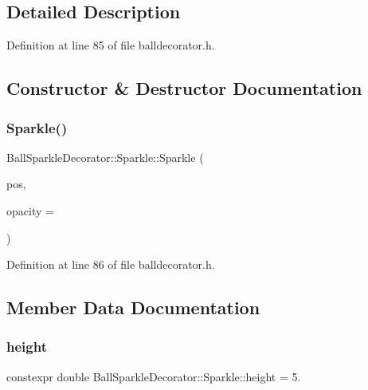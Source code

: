 \subsection{Detailed Description}


Definition at line 85 of file balldecorator.\+h.



\subsection{Constructor \& Destructor Documentation}
\mbox{\label{struct_ball_sparkle_decorator_1_1_sparkle_a3c722e501faf223889464bd622375c11}} 
\subsubsection{\texorpdfstring{Sparkle()}{Sparkle()}}
{\footnotesize\ttfamily Ball\+Sparkle\+Decorator\+::\+Sparkle\+::\+Sparkle (\begin{DoxyParamCaption}\item[{Q\+PointF}]{pos,  }\item[{double}]{opacity = {} }\end{DoxyParamCaption})\hspace{0.3cm}{\ttfamily [inline]}}



Definition at line 86 of file balldecorator.\+h.



\subsection{Member Data Documentation}
\mbox{\label{struct_ball_sparkle_decorator_1_1_sparkle_a3098571dbcb489f4821ac0446ef18d26}} 
\subsubsection{\texorpdfstring{height}{height}}
{\footnotesize\ttfamily constexpr double Ball\+Sparkle\+Decorator\+::\+Sparkle\+::height = 5.\hspace{0.3cm}{\ttfamily [static]}}



